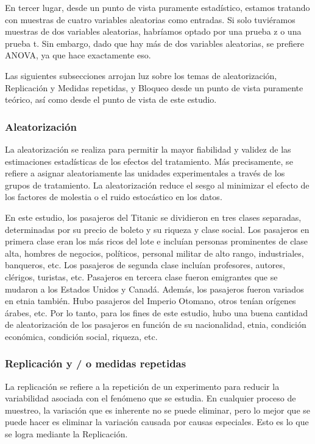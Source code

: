 \documentclass[]{article}
\begin{document}
En tercer lugar, desde un punto de vista puramente estadístico, estamos
tratando con muestras de cuatro variables aleatorias como entradas. Si
solo tuviéramos muestras de dos variables aleatorias, habríamos optado
por una prueba z o una prueba t. Sin embargo, dado que hay más de dos
variables aleatorias, se prefiere ANOVA, ya que hace exactamente eso.

Las siguientes subsecciones arrojan luz sobre los temas de
aleatorización, Replicación y Medidas repetidas, y Bloqueo desde un
punto de vista puramente teórico, así como desde el punto de vista de
este estudio.

\subsubsection{Aleatorización}\label{aleatorizacion}

La aleatorización se realiza para permitir la mayor fiabilidad y validez
de las estimaciones estadísticas de los efectos del tratamiento. Más
precisamente, se refiere a asignar aleatoriamente las unidades
experimentales a través de los grupos de tratamiento. La aleatorización
reduce el sesgo al minimizar el efecto de los factores de molestia o el
ruido estocástico en los datos.

En este estudio, los pasajeros del Titanic se dividieron en tres clases
separadas, determinadas por su precio de boleto y su riqueza y clase
social. Los pasajeros en primera clase eran los más ricos del lote e
incluían personas prominentes de clase alta, hombres de negocios,
políticos, personal militar de alto rango, industriales, banqueros, etc.
Los pasajeros de segunda clase incluían profesores, autores, clérigos,
turistas, etc. Pasajeros en tercera clase fueron emigrantes que se
mudaron a los Estados Unidos y Canadá. Además, los pasajeros fueron
variados en etnia también. Hubo pasajeros del Imperio Otomano, otros
tenían orígenes árabes, etc. Por lo tanto, para los fines de este
estudio, hubo una buena cantidad de aleatorización de los pasajeros en
función de su nacionalidad, etnia, condición económica, condición
social, riqueza, etc.

\subsubsection{Replicación y / o medidas
repetidas}\label{replicacion-y-o-medidas-repetidas}

La replicación se refiere a la repetición de un experimento para reducir
la variabilidad asociada con el fenómeno que se estudia. En cualquier
proceso de muestreo, la variación que es inherente no se puede eliminar,
pero lo mejor que se puede hacer es eliminar la variación causada por
causas especiales. Esto es lo que se logra mediante la Replicación.
\end{document}
